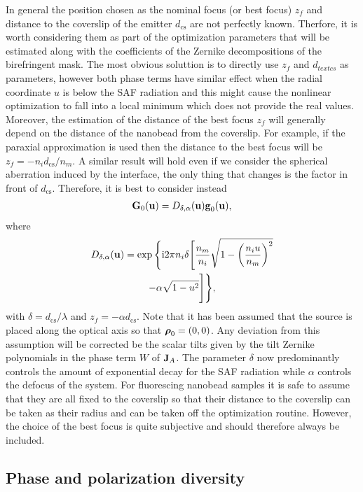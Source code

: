 \documentclass[reprint,aps,pra,superscriptaddress,
amsmath,amssymb]{revtex4-1}
\begin{document}
In general the position chosen as the nominal focus (or best focus) $z_f$ and 
distance to the coverslip of the emitter $d_\text{cs} $ are not perfectly 
known. Therfore,
it is worth considering them as part of the optimization parameters that 
will be estimated along with the coefficients of the Zernike decompositions 
of the birefringent mask. The most obvious soluttion is to directly 
use $z_f$ and $d_{text{cs}}$ as parameters, however both phase 
terms have similar effect when the 
radial coordinate $u$ is below the SAF radiation and this might cause the 
nonlinear optimization to fall into a local minimum which does not provide
the real values.
Moreover, the estimation 
of the distance of the best focus $z_f$ will generally depend on the distance 
of the nanobead from the coverslip. For example, if the paraxial 
approximation is used then the distance to the best focus will be 
$z_f = -n_i d_\text{cs} /n_m$. A similar result will hold even if we consider 
the spherical aberration induced by the interface, the only thing that changes 
is the factor in front of $d_\text{cs} $. Therefore, it is best to 
consider instead
\begin{align}
\textbf G_0  (\textbf u)  = D_{\delta, \alpha} (\textbf u) \textbf g_0 (\textbf u),
\end{align}
where
\begin{multline}
D_{\delta, \alpha} (\textbf u)= \exp \Bigg\{  \text{i} 2 \pi n_i  \delta \Bigg[ \frac{n_m}{n_i} \sqrt{1 - \left(\frac{n_i u}{n_m} \right)^2 }  \\
- \alpha \sqrt{1 - u^2} \Bigg] \Bigg\} , 
\end{multline}
with $\delta = d_\text{cs} / \lambda$ and $z_f = -\alpha d_\text{cs}$. 
Note that it has been assumed that the source is placed  
 along the optical axis so that $\boldsymbol \rho_0 = (0,0)$. 
Any deviation from this assumption will be corrected be the scalar tilts 
given by the tilt Zernike polynomials in the phase term $W$ of $\textbf J_A$.
The parameter $\delta$ now predominantly controls the amount of exponential 
decay for the SAF radiation while $\alpha$ controls the defocus of the system. 
For fluorescing nanobead samples it is safe to 
assume that they are all fixed to the coverslip so that their distance to the 
coverslip can be taken as their radius and can be taken off the optimization
routine.  However, the choice of the best focus is quite subjective and should 
therefore always be included.


\subsection{Phase and polarization diversity}
\end{document}
